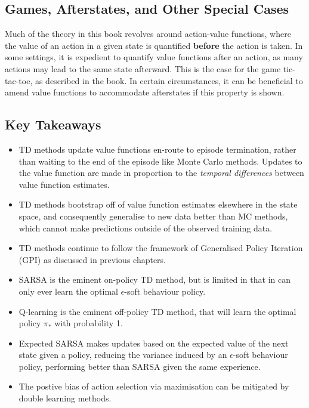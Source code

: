 \subsection{Games, Afterstates, and Other Special Cases}
Much of the theory in this book revolves around action-value functions, where the value of an action in a given state is quantified \textbf{before} the action is taken. In some settings, it is expedient to quantify value functions after an action, as many actions may lead to the same state afterward. This is the case for the game tic-tac-toe, as described in the book. In certain circumstances, it can be beneficial to amend value functions to accommodate afterstates if this property is shown.

\subsection{Key Takeaways}
\begin{itemize}
	\item TD methods update value functions en-route to episode termination, rather than waiting to the end of the episode like Monte Carlo methods. Updates to the value function are made in proportion to the \textit{temporal differences} between value function estimates.
	\item TD methods bootstrap off of value function estimates elsewhere in the state space, and consequently generalise to new data better than MC methods, which cannot make predictions outside of the observed training data.
	\item TD methods continue to follow the framework of Generalised Policy Iteration (GPI) as discussed in previous chapters.
	\item SARSA is the eminent on-policy TD method, but is limited in that in can only ever learn the optimal $\epsilon$-soft behaviour policy.
	\item Q-learning is the eminent off-policy TD method, that will learn the optimal policy $\pi_*$ with probability 1.
	\item Expected SARSA makes updates based on the expected value of the next state given a policy, reducing the variance induced by an $\epsilon$-soft behaviour policy, performing better than SARSA given the same experience.
	\item The postive bias of action selection via maximisation can be mitigated by double learning methods.
\end{itemize}













